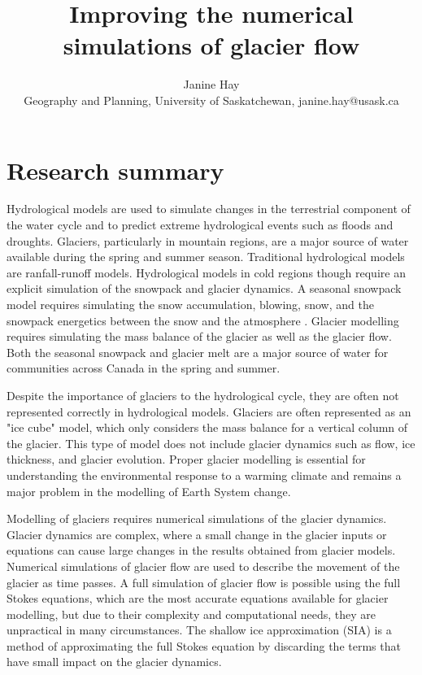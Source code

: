 \documentclass{article}
\title{Improving the numerical simulations of glacier flow}
\author{Janine Hay \\
        \small Geography and Planning, University of Saskatchewan, janine.hay@usask.ca\\

}
\date{} %
\begin{document}
\maketitle
\newpage
\tableofcontents
\newpage
\section{Research summary}
Hydrological models are used to simulate changes in the terrestrial component of the water cycle and to predict extreme hydrological events such as floods and droughts. Glaciers, particularly in mountain regions, are a major source of water available during the spring and summer season. Traditional hydrological models are ranfall-runoff models. Hydrological models in cold regions though require an explicit simulation of the snowpack and glacier dynamics. A seasonal snowpack model requires simulating the snow accumulation, blowing, snow, and the snowpack energetics between the snow and the atmosphere \citep{Pomeroy2007}. Glacier modelling requires simulating the mass balance of the glacier as well as the glacier flow. Both the seasonal snowpack and glacier melt are a major source of water for communities across Canada in the spring and summer.

Despite the importance of glaciers to the hydrological cycle, they are often not represented correctly in hydrological models. Glaciers are often represented as an "ice cube" model, which only considers the mass balance for a vertical column of the glacier. This type of model does not include glacier dynamics such as flow, ice thickness, and glacier evolution. Proper glacier modelling is essential for understanding the environmental response to a warming climate and remains a major problem in the modelling of Earth System change.  

Modelling of glaciers requires numerical simulations of the glacier dynamics. Glacier dynamics are complex, where a small change in the glacier inputs or equations can cause large changes in the results obtained from glacier models. Numerical simulations of glacier flow are used to describe the movement of the glacier as time passes. A full simulation of glacier flow is possible using the full Stokes equations, which are the most accurate equations available for glacier modelling, but due to their complexity and computational needs, they are unpractical in many circumstances. The shallow ice approximation (SIA) is a method of approximating the full Stokes equation by discarding the terms that have small impact on the glacier dynamics.
\end{document}
